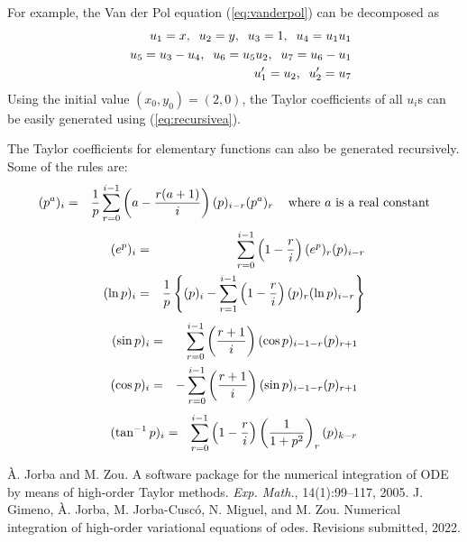 \documentclass[10pt]{article}
\theoremstyle{remark}
\begin{document}
For example, the Van der Pol equation (\ref{eq:vanderpol}) can be
decomposed as
\begin{eqnarray*}
& & u_1 = x,\;\;  u_2 = y,\;\; u_3 = 1,\;\; u_4= u_1 u_1\cr
& & u_5 = u_3-u_4,\;\; u_6 = u_5 u_2,\;\; u_7= u_6-u_1\cr
& & u_1' = u_2, \;\; u_2'= u_7
\end{eqnarray*}
Using the initial value $(x_0, y_0)=(2, 0)$, the Taylor coefficients
of all $u_i$s can be easily generated using (\ref{eq:recursivea}).


The Taylor coefficients for elementary functions can also be generated
recursively. Some of the rules are:
\begin{eqnarray*}
(p^a)_i &=& {1 \over p} \sum_{r=0}^{i-1}\left(
a - { {r(a+1)\over i}}\right)(p)_{i-r}(p^a)_r\;\;\; \mbox{
where $a$ is a real constant} 
\end{eqnarray*}
\begin{eqnarray*}
(e^p)_i &=& \sum_{r=0}^{i-1} \left(1-{r\over i}\right)
(e^p)_r (p)_{i-r}\cr
(\ln p)_i &=& {1\over {p}} \left\{ (p)_i - \sum_{r=1}^{i-1}
\left(1 - {r\over i}\right)(p)_r(\ln p)_{i-r}\right\}
\end{eqnarray*}
\begin{eqnarray*}
(\sin p)_i &=& \sum_{r=0}^{i-1}\left({{r+1}\over
i}\right)(\cos p)_{i-1-r} (p)_{r+1}\cr
(\cos p)_i &=& -\sum_{r=0}^{i-1}\left({{r+1}\over
i}\right)(\sin p)_{i-1-r} (p)_{r+1}\cr
\end{eqnarray*}
\begin{eqnarray*}
(\tan^{-1} p)_i &=& \sum_{r=0}^{i-1}\left(1 - {r\over i}\right)
\left( {1 \over {1+p^2}}\right)_r (p)_{k-r}
\end{eqnarray*}



\begin{thebibliography}{9}
 \`A. Jorba and M. Zou. A software package for the
  numerical integration of ODE by means of high-order Taylor
  methods. {\it Exp. Math.}, 14(1):99–117, 2005.
 J. Gimeno, \`A. Jorba, M. Jorba-Cusc\'o, N. Miguel,
  and M. Zou. Numerical integration of high-order variational
  equations of odes. Revisions submitted, 2022.
\end{thebibliography}
\end{document}
